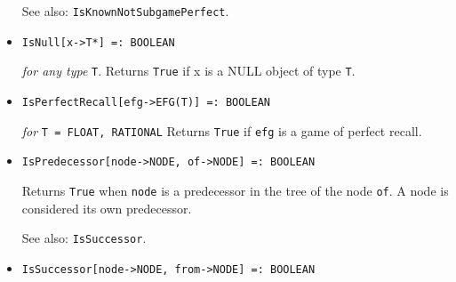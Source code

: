 \begin{itemize}
{\it for} {\tt T = FLOAT, RATIONAL}
\bd
Returns \verb+True+ if \verb+profile+
is known by Gambit to be a subgame perfect Nash
equilibrium.  There is currently no
definitive test in Gambit for whether an arbitrary profile is subgame
perfect.  However, any Nash equilibrium of an extensive form game which
is computed when all subgames are marked will only return a subgame
perfect equilibrium.  
\item [See also:] \verb+IsKnownNotSubgamePerfect+.
\ed

\item{}
\protect \large \begin{verbatim}
IsNull[x->T*] =: BOOLEAN
\end{verbatim}\normalsize

{\it for any type } {\tt T}.
\bd
Returns \verb+True+ if x is a NULL object of type \verb+T+.  
\ed

\item{}
\protect \large \begin{verbatim}
IsPerfectRecall[efg->EFG(T)] =: BOOLEAN
\end{verbatim}\normalsize

{\it for} {\tt T = FLOAT, RATIONAL}
\bd 
Returns \verb+True+ if \verb+efg+ is a game of perfect recall.
\ed


\item{}
\protect \large \begin{verbatim}
IsPredecessor[node->NODE, of->NODE] =: BOOLEAN
\end{verbatim}\normalsize

\bd
Returns \verb+True+ when \verb+node+ is a predecessor
in the tree of the node \verb+of+.  A node is considered its own predecessor.
\item [See also:] \verb+IsSuccessor+.
\ed



\item{}
\protect \large \begin{verbatim}
IsSuccessor[node->NODE, from->NODE] =: BOOLEAN
\end{verbatim}\normalsize


\end{itemize}
